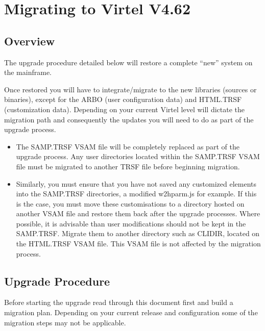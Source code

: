 \documentclass[letterpaper,10pt,english]{sphinxmanual}
\begin{document}
\newpage

\ignorespaces 

\chapter{Migrating to Virtel V4.62}
\label{\detokenize{Migration_Guide:migrating-to-virtel-v4-62}}\label{\detokenize{Migration_Guide:v462mi-introduction}}\label{\detokenize{Migration_Guide:index-0}}

\section{Overview}
\label{\detokenize{Migration_Guide:overview}}
\sphinxAtStartPar
The upgrade procedure detailed below will restore a complete “new” system on the mainframe.

\sphinxAtStartPar
Once restored you will have to integrate/migrate to the new libraries (sources or binaries), except for the ARBO (user configuration data) and HTML.TRSF (customization data). Depending on your current Virtel level will dictate the migration path and consequently the updates you will need to do as part of the upgrade process.
\begin{itemize}
\item {} 
\sphinxAtStartPar
The SAMP.TRSF VSAM file will be completely replaced as part of the upgrade process. Any user directories located within the SAMP.TRSF VSAM file must be migrated to another TRSF file before beginning migration.

\item {} 
\sphinxAtStartPar
Similarly, you must ensure that you have not saved any customized elements into the SAMP.TRSF directories, a modified w2hparm.js for example. If this is the case, you must move these customisations to a directory hosted on another VSAM file and restore them back after the upgrade processes. Where possible, it is advisable than user modifications should not be kept in the SAMP.TRSF. Migrate them to another directory such as CLI\sphinxhyphen{}DIR, located on the HTML.TRSF VSAM file. This VSAM file is not affected by the migration process.

\end{itemize}

\newpage

\ignorespaces 

\section{Upgrade Procedure}
\label{\detokenize{Migration_Guide:upgrade-procedure}}\label{\detokenize{Migration_Guide:index-1}}
\sphinxAtStartPar
Before starting the upgrade read through this document first and build a migration plan. Depending on your current release and configuration some of the migration steps may not be applicable.
\end{document}
